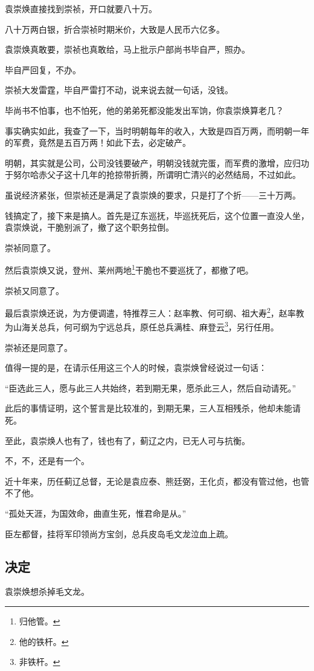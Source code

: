\begin{multicols}{\theparacolNo}
		袁崇焕直接找到崇祯，开口就要八十万。

		八十万两白银，折合崇祯时期米价，大致是人民币六亿多。

		袁崇焕真敢要，崇祯也真敢给，马上批示户部尚书毕自严，照办。

		毕自严回复，不办。

		崇祯大发雷霆，毕自严雷打不动，说来说去就一句话，没钱。

		毕尚书不怕事，也不怕死，他的弟弟死都没能发出军饷，你袁崇焕算老几？

		事实确实如此，我查了一下，当时明朝每年的收入，大致是四百万两，而明朝一年的军费，竟然是五百万两！如此下去，必定破产。

		明朝，其实就是公司，公司没钱要破产，明朝没钱就完蛋，而军费的激增，应归功于努尔哈赤父子这十几年的抢掠带折腾，所谓明亡清兴的必然结局，不过如此。

		虽说经济紧张，但崇祯还是满足了袁崇焕的要求，只是打了个折——三十万两。

		钱搞定了，接下来是搞人。首先是辽东巡抚，毕巡抚死后，这个位置一直没人坐，袁崇焕说，干脆别派了，撤了这个职务拉倒。

		崇祯同意了。

		然后袁崇焕又说，登州、莱州两地\footnote{归他管。}干脆也不要巡抚了，都撤了吧。

		崇祯又同意了。

		最后袁崇焕还说，为方便调遣，特推荐三人：赵率教、何可纲、祖大寿\footnote{他的铁杆。}，赵率教为山海关总兵，何可纲为宁远总兵，原任总兵满桂、麻登云\footnote{非铁杆。}，另行任用。

		崇祯还是同意了。

		值得一提的是，在请示任用这三个人的时候，袁崇焕曾经说过一句话：

		“臣选此三人，愿与此三人共始终，若到期无果，愿杀此三人，然后自动请死。”

		此后的事情证明，这个誓言是比较准的，到期无果，三人互相残杀，他却未能请死。

		至此，袁崇焕人也有了，钱也有了，蓟辽之内，已无人可与抗衡。

		不，不，还是有一个。

		近十年来，历任蓟辽总督，无论是袁应泰、熊廷弼，王化贞，都没有管过他，也管不了他。

		“孤处天涯，为国效命，曲直生死，惟君命是从。”

		臣左都督，挂将军印领尚方宝剑，总兵皮岛毛文龙泣血上疏。

		\subsection{决定}
		袁崇焕想杀掉毛文龙。


\end{multicols}
